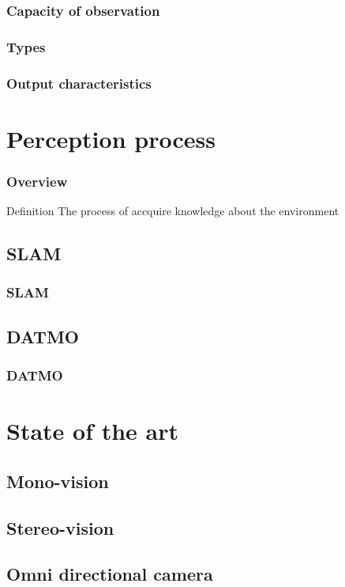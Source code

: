 \documentclass{beamer}
\begin{document}
	\begin{frame}
		\frametitle{Capacity of observation}
	\end{frame}
	
	\begin{frame}
		\frametitle{Types}
	\end{frame}
	
	\begin{frame}
		\frametitle{Output characteristics}
	\end{frame}

\section{Perception process}

	\begin{frame}
		\frametitle{Overview}
		\begin{block}{Definition}
			The process of accquire knowledge about the environment \cite{iyengar1991autonomous}
		\end{block}		
	\end{frame}

	\subsection{SLAM}
		\begin{frame}
			\frametitle{SLAM}
		\end{frame}
	
	\subsection{DATMO}
		\begin{frame}
			\frametitle{DATMO}
		\end{frame}

\section{State of the art}
\subsection{Mono-vision}
\subsection{Stereo-vision}
\subsection{Omni directional camera}
\end{document}
